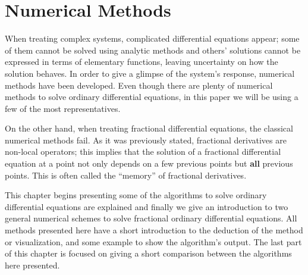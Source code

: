 \chapter{Numerical Methods}
When treating complex systems, complicated differential equations appear; some of them cannot be solved using analytic methods and others' solutions cannot be expressed in terms of elementary functions, leaving uncertainty on how the solution behaves. In order to give a glimpse of the system's response, numerical methods have been developed. Even though there are plenty of numerical methods to solve ordinary differential equations, in this paper we will be using a few of the most representatives.

On the other hand, when treating fractional differential equations, the classical numerical methods fail. As it was previously stated, fractional derivatives are non-local operators; this implies that the solution of a fractional differential equation at a point not only depends on a few previous points but \textbf{all} previous points. This is often called the ``memory'' of fractional derivatives.

This chapter begins presenting some of the algorithms to solve ordinary differential equations are explained and finally we give an introduction to two general numerical schemes to solve fractional ordinary differential equations. All methods presented here have a short introduction to the deduction of the method or visualization, and some example to show the algorithm's output. The last part of this chapter is focused on giving a short comparison between the algorithms here presented.